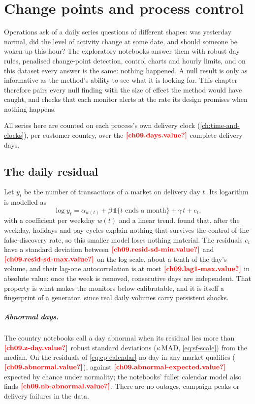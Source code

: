 \chapter{Change points and process control}\label{ch:change-points}

Operations ask of a daily series questions of different shapes: was yesterday normal, did the level of activity change
at some date, and should someone be woken up this hour? The exploratory notebooks answer them with robust day rules,
penalised change-point detection, control charts and hourly limits, and on this dataset every answer is the same: nothing
happened. A null result is only as informative as the method's ability to see what it is looking for. This chapter
therefore pairs every null finding with the size of effect the method would have caught, and checks that each monitor
alerts at the rate its design promises when nothing happens.

All series here are counted on each process's own delivery clock (\cref{ch:time-and-clocks}), per customer country,
over the $\est{ch09.days}{value}$ complete delivery days.

\section{The daily residual}\label{sec:cp-residual}

Let $y_t$ be the number of transactions of a market on delivery day $t$. Its logarithm is modelled as
\begin{equation}\label{eq:cp-calendar}
  \log y_t = \alpha_{w(t)} + \beta\, \mathbb{1}\{t \text{ ends a month}\} + \gamma\, t + e_t ,
\end{equation}
with a coefficient per weekday $w(t)$ and a linear trend.  found that, after the weekday,
holidays and pay cycles explain nothing that survives the control of the false-discovery rate, so this smaller model
loses nothing material. The residuals $e_t$ have a standard deviation between $\est{ch09.resid-sd-min}{value}$ and
$\est{ch09.resid-sd-max}{value}$ on the log scale, about a tenth of the day's volume, and their lag-one autocorrelation
is at most $\est{ch09.lag1-max}{value}$ in absolute value: once the week is removed, consecutive days are independent.
That property is what makes the monitors below calibratable, and it is itself a fingerprint of a generator, since
real daily volumes carry persistent shocks.

\paragraph{Abnormal days.} The country notebooks call a day abnormal when its residual lies more than
$\est{ch09.z-day}{value}$ robust standard deviations ($\kappa\,\mathrm{MAD}$, \cref{eq:sf-scale}) from the median. On the residuals of
\cref{eq:cp-calendar} no day in any market qualifies ($\est{ch09.abnormal}{value}$), against
$\est{ch09.abnormal-expected}{value}$ expected by chance under normality; the notebooks' fuller calendar model also finds
$\est{ch09.nb-abnormal}{value}$. There are no outages, campaign peaks or delivery failures in the data.

